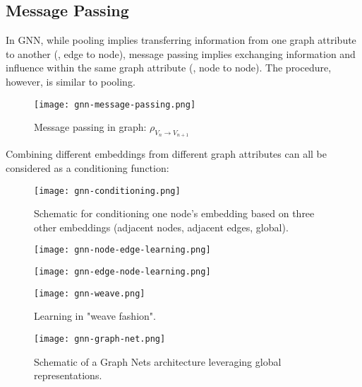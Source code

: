\subsection{Message Passing}
In \ac{GNN}, while pooling implies transferring information from one graph attribute to another (\eg, edge to node), message passing implies exchanging information and influence within the same graph attribute (\eg, node to node). The procedure, however, is similar to pooling.
\begin{figure}[hbt!]
	\centering
	\texttt{[image: gnn-message-passing.png]}
	\caption{Message passing in graph: $\rho_{V_n \rightarrow V_{n+1}}$}
	\label{fig:gnn-message-passing}
\end{figure}

Combining different embeddings from different graph attributes can all be considered as a conditioning function:
\begin{figure}[hbt!]
	\centering
	\texttt{[image: gnn-conditioning.png]}
	\caption{Schematic for conditioning one node's embedding based on three other embeddings (adjacent nodes, adjacent edges, global).}
	\label{fig:gnn-conditioning}
\end{figure}

\begin{figure}[hbt!]
	\centering
	\begin{minipage}{.47\textwidth}
		\centering
		\texttt{[image: gnn-node-edge-learning.png]}
	\end{minipage}
	\hfil
	\begin{minipage}{.47\textwidth}
		\centering
		\texttt{[image: gnn-edge-node-learning.png]}
	\end{minipage}
\end{figure}
\begin{figure}[hbt!]
	\centering
	\texttt{[image: gnn-weave.png]}
	\caption{Learning in "weave fashion".}
\end{figure}
\begin{figure}[hbt!]
	\centering
	\texttt{[image: gnn-graph-net.png]}
	\caption{Schematic of a Graph Nets architecture leveraging global representations.}
\end{figure}

